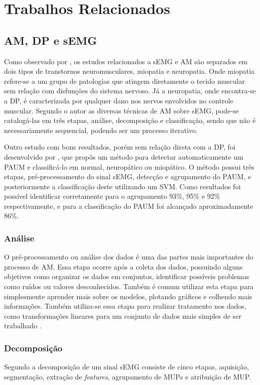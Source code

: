 \chapter{Trabalhos Relacionados}
\label{ch:TrabalhosRelacionados}

\section{AM, DP e sEMG}
Como observado por \cite{yousefi2014characterizing}, os estudos relacionados a sEMG e AM são separados em  dois tipos de transtornos neuromusculares, miopatia e neuropatia. Onde miopatia refere-se a um grupo de patologias que atingem diretamente o tecido muscular sem relação com disfunções do sistema nervoso. Já a neuropatia, onde encontra-se a DP, é caracterizada por qualquer dano nos nervos envolvidos no controle muscular. Segundo o autor \cite{yousefi2014characterizing} as diversas técnicas de AM sobre sEMG, pode-se catalogá-las em três etapas, análise, decomposição e classificação, sendo que não é necessariamente sequencial, podendo ser um processo iterativo.

Outro estudo com bons resultados, porém sem relação direta com a DP, foi desenvolvido por \cite{katsis2006novel}, que propôs um método para detectar automaticamente um PAUM e classificá-lo em normal, neuropático ou miopático. O método possui três etapas, pré-processamento do sinal sEMG, detecção e agrupamento do PAUM, e posteriormente a classificação deste utilizando um SVM. Como resultados foi possível identificar corretamente para o agrupamento 93\%, 95\% e 92\% respectivamente, e para a classificação do PAUM foi alcançado aproximadamente 86\%. 

\subsection{Análise}
O pré-processamento ou análise dos dados é uma das partes mais importantes do processo de AM. Essa etapa ocorre após a coleta dos dados, possuindo alguns objetivos como organizar os dados em conjuntos, identificar possíveis problemas como ruídos ou valores desconhecidos. Também é comum utilizar esta etapa para simplesmente aprender mais sobre os modelos, plotando gráficos e colhendo mais informações. Também utiliza-se essa etapa para realizar tratamento nos dados, como transformações lineares para um conjunto de dados mais simples de ser trabalhado \cite{batista2003pre}. 

\subsection{Decomposição}
Segundo  a decomposição de um sinal sEMG consiste de cinco etapas, aquisição, segmentação, extração de \textit{features}, agrupamento de MUPs e atribuição de MUP.

